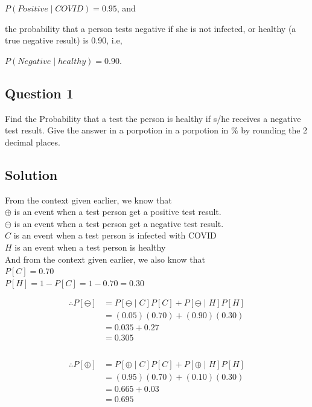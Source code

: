 \documentclass[12pt]{report} %
\begin{document}
$P(Positive \mid COVID) = 0.95$, and

\noindent the probability that a person tests negative if she is not
infected, or healthy (a true negative result) is 0.90, i.e,

$P(Negative \mid healthy) = 0.90$.

\subsection*{Question 1}

Find the Probability that a test the person is healthy if s/he
receives a negative test result. Give the answer in a porpotion in
a porpotion in $\%$ by rounding the 2 decimal places.

\subsection*{Solution}

From the context given earlier, we know that \\
$\oplus$ is an event when a test person get a positive test result. \\
$\ominus$ is an event when a test person get a negative test result. \\
$C$ is an event when a test person is infected with COVID \\
$H$ is an event when a test person is healthy \\

\noindent And from the context given earlier, we also know that \\
$P[C] = 0.70$ \\
$P[H] = 1 - P[C] = 1 - 0.70 = 0.30$ \\

\newpage

\begin{multicols}{2} \notag

\begin{align}
    \therefore P[\ominus] & = P[\ominus \mid C]P[C] + P[\ominus \mid H]P[H] \\
    & = (0.05)(0.70) + (0.90)(0.30) \\
    & = 0.035 + 0.27 \\
    & = 0.305 \\
    \\
\end{align}

\columnbreak

\begin{align}
    \therefore P[\oplus] & = P[\oplus \mid C]P[C] + P[\oplus \mid H]P[H] \\
    & = (0.95)(0.70) + (0.10)(0.30) \\
    & = 0.665 + 0.03 \\
    & = 0.695 \\
    \\
\end{align}

\end{multicols}
\end{document}
